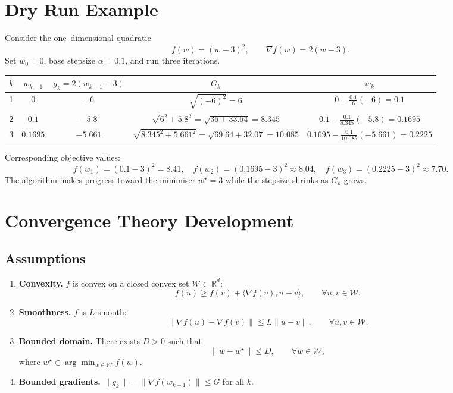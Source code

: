 \documentclass{article}
\newcommand{\R}{\mathbb{R}}
\begin{document}
\section*{Dry Run Example}
Consider the one–dimensional quadratic
\[
f(w)=(w-3)^2,\qquad \nabla f(w)=2(w-3).
\]
Set $w_0=0$, base stepsize $\alpha=0.1$, and run three iterations.

\begin{center}
\begin{tabular}{c|c|c|c|c}
$k$ & $w_{k-1}$ & $g_k=2(w_{k-1}-3)$ & $G_k$ & $w_k$ \\ \hline
1 &
$0$ &
$-6$ &
$\sqrt{(-6)^2}=6$ &
$0-\frac{0.1}{6}(-6)=0.1$ \\[4pt]
2 &
$0.1$ &
$-5.8$ &
$\sqrt{6^2+5.8^2}= \sqrt{36+33.64}=8.345$ &
$0.1-\frac{0.1}{8.345}(-5.8)=0.1695$ \\[4pt]
3 &
$0.1695$ &
$-5.661$ &
$\sqrt{8.345^2+5.661^2}= \sqrt{69.64+32.07}=10.085$ &
$0.1695-\frac{0.1}{10.085}(-5.661)=0.2225$
\end{tabular}
\end{center}

Corresponding objective values:
\[
f(w_1)= (0.1-3)^2=8.41,\quad
f(w_2)= (0.1695-3)^2\approx8.04,\quad
f(w_3)= (0.2225-3)^2\approx7.70.
\]
The algorithm makes progress toward the minimiser $w^\star=3$ while the stepsize shrinks as $G_k$ grows.

\section*{Convergence Theory Development}

\subsection*{Assumptions}
\begin{enumerate}
\item \textbf{Convexity.} $f$ is convex on a closed convex set $\mathcal{W}\subset\R^d$:
\[
f(u)\ge f(v)+\langle\nabla f(v),u-v\rangle,\qquad\forall u,v\in\mathcal{W}.
\tag{A1}
\]
\item \textbf{Smoothness.} $f$ is $L$‑smooth:
\[
\|\nabla f(u)-\nabla f(v)\|\le L\|u-v\|,\qquad\forall u,v\in\mathcal{W}.
\tag{A2}
\]
\item \textbf{Bounded domain.} There exists $D>0$ such that
\[
\|w-w^\star\|\le D,\qquad\forall w\in\mathcal{W},
\]
where $w^\star\in\arg\min_{w\in\mathcal{W}}f(w)$.
\item \textbf{Bounded gradients.} $\|g_k\|=\|\nabla f(w_{k-1})\|\le G$ for all $k$.
\end{enumerate}
\end{document}
